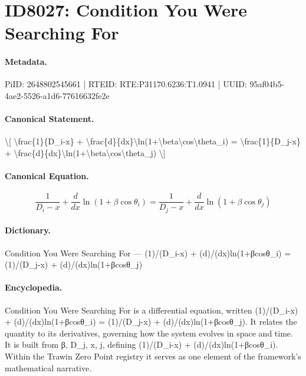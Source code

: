 \section*{ID8027: Condition You Were Searching For}
\paragraph{Metadata.}
PiID: 2648802545661 | RTEID: RTE:P31170.6236:T1.0941 | UUID: 95af04b5-4ae2-5526-a1d6-77616632fe2e

\paragraph{Canonical Statement.}
\textbackslash{}[ \textbackslash{}frac\{1\}\{D\_i-x\} + \textbackslash{}frac\{d\}\{dx\}\textbackslash{}ln(1+\textbackslash{}beta\textbackslash{}cos\textbackslash{}theta\_i) = \textbackslash{}frac\{1\}\{D\_j-x\} + \textbackslash{}frac\{d\}\{dx\}\textbackslash{}ln(1+\textbackslash{}beta\textbackslash{}cos\textbackslash{}theta\_j) \textbackslash{}]

\paragraph{Canonical Equation.}
\[
\frac{1}{D_i-x} + \frac{d}{dx}\ln(1+\beta\cos\theta_i) = \frac{1}{D_j-x} + \frac{d}{dx}\ln(1+\beta\cos\theta_j)
\]

\paragraph{Dictionary.}
Condition You Were Searching For — (1)/(D\_i-x) + (d)/(dx)ln(1+βcosθ\_i) = (1)/(D\_j-x) + (d)/(dx)ln(1+βcosθ\_j)

\paragraph{Encyclopedia.}
Condition You Were Searching For is a differential equation, written (1)/(D\_i-x) + (d)/(dx)ln(1+βcosθ\_i) = (1)/(D\_j-x) + (d)/(dx)ln(1+βcosθ\_j). It relates the quantity to its derivatives, governing how the system evolves in space and time. It is built from β, D\_j, x, j, defining (1)/(D\_i-x) + (d)/(dx)ln(1+βcosθ\_i). Within the Trawin Zero Point registry it serves as one element of the framework's mathematical narrative.
